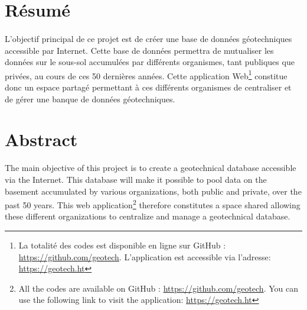 \section{Résumé}
\paragraph{}
L'objectif principal de ce projet est de créer une base de données géotechni\-ques
 accessible par Internet. Cette base de données permettra de mutualiser les données 
 sur le sous-sol accumulées par différents organismes, tant publiques que privées, 
 au cours de ces 50 dernières années. Cette application 
 Web\footnote{ La totalité des codes est disponible en ligne sur GitHub : \url{https://github.com/geotech}.
 L’application est accessible via l’adresse: \url{https://geotech.ht}}
  constitue donc un espace 
 partagé permettant à ces différents organismes de centraliser et de gérer une banque 
 de données géotechniques.


\newpage
\section{Abstract}
The main objective of this project is to create a geotechnical 
database accessible via the Internet. This database will make it possible to pool data
 on the basement accumulated by various organizations, both public and private,
 over the past 50 years. This web application\footnote{ All the codes are available on GitHub : \url{https://github.com/geotech}.
 You can use the following link to visit the application: \url{https://geotech.ht}} therefore constitutes a space
 shared allowing these different organizations to centralize and manage a
 geotechnical database.
